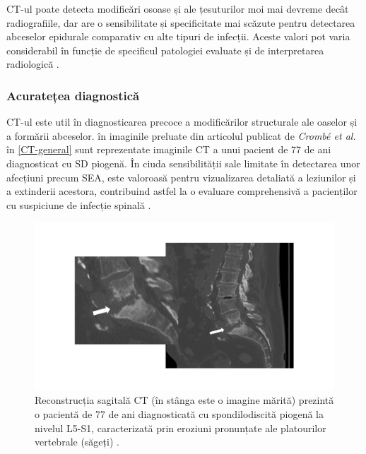 \documentclass[romanian,12pt,a4paper]{article}
\begin{document}
CT-ul poate detecta modificări osoase și ale țesuturilor moi mai devreme
decât radiografiile, dar are o sensibilitate și specificitate mai
scăzute pentru detectarea abceselor epidurale comparativ cu alte tipuri
de infecții. Aceste valori pot varia considerabil în funcție de
specificul patologiei evaluate și de interpretarea radiologică
\cite{ImagingCharacteristicsCT2022}\cite{ImagingAssessmentSpine2024}.

\subsubsection{Acuratețea diagnostică}

CT-ul este util în diagnosticarea precoce a modificărilor structurale
ale oaselor și a formării abceselor. în imaginile preluate din articolul
publicat de \emph{Crombé et al.} în \ref{CT-general}{}
sunt reprezentate imaginile CT a unui pacient de 77 de ani diagnosticat
cu SD piogenă. În ciuda sensibilității sale limitate în detectarea unor
afecțiuni precum SEA, este valoroasă pentru vizualizarea detaliată a
leziunilor și a extinderii acestora, contribuind astfel la o evaluare
comprehensivă a pacienților cu suspiciune de infecție spinală
\cite{ImagingCharacteristicsCT2022}\cite{ImagingAssessmentSpine2024}.

\begin{figure}
\centering
\includegraphics[width=\textwidth]{Files/CT-general.png}
\caption{Reconstrucția sagitală CT (în stânga este o imagine mărită)
prezintă o pacientă de 77 de ani diagnosticată cu spondilodiscită
piogenă la nivelul L5-S1, caracterizată prin eroziuni pronunțate ale
platourilor vertebrale (săgeți)
\cite{ImagingSpondylodiscitisComprehensive2024}.}
\end{figure}

\label{CT-general}{}
\end{document}
